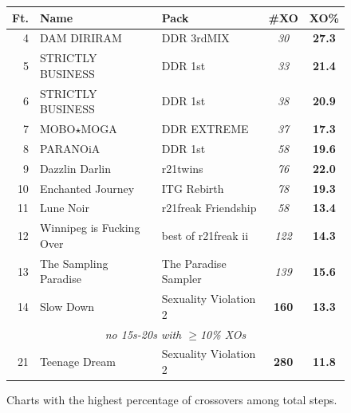 \documentclass[10pt]{sigplanconf}
\begin{document}
\begin{figure}[t]
	\begin{center}
		\small
	\begin{tabular}{r|l|l|c|c}
		\bf Ft. & \bf Name & \bf Pack & \bf \#XO & \bf XO\% \\
		\hline
		 4 & DAM DIRIRAM              & DDR 3rdMIX            & \em  30 & \bf 27.3 \\
		 5 & STRICTLY BUSINESS        & DDR 1st               & \em  33 & \bf 21.4 \\
		 6 & STRICTLY BUSINESS        & DDR 1st               & \em  38 & \bf 20.9 \\
		 7 & MOBO$\star$MOGA          & DDR EXTREME           & \em  37 & \bf 17.3 \\
		 8 & PARANOiA                 & DDR 1st               & \em  58 & \bf 19.6 \\
		 9 & Dazzlin Darlin           & r21twins              & \em  76 & \bf 22.0 \\
		10 & Enchanted Journey        & ITG Rebirth           & \em  78 & \bf 19.3 \\
		11 & Lune Noir                & r21freak Friendship   & \em  58 & \bf 13.4 \\
		12 & Winnipeg is Fucking Over & best of r21freak ii   & \em 122 & \bf 14.3 \\
		13 & The Sampling Paradise    & The Paradise Sampler  & \em 139 & \bf 15.6 \\
		14 & Slow Down                & Sexuality Violation 2 & \bf 160 & \bf 13.3 \\
		\multicolumn{5}{c}{\em no 15s-20s with $\ge$10\% XOs} \\
		21 & Teenage Dream            & Sexuality Violation 2 & \bf 280 & \bf 11.8 \\
	\end{tabular}
	\end{center}
	\caption{Charts with the highest percentage of crossovers among total steps.}
\end{figure}
\end{document}
